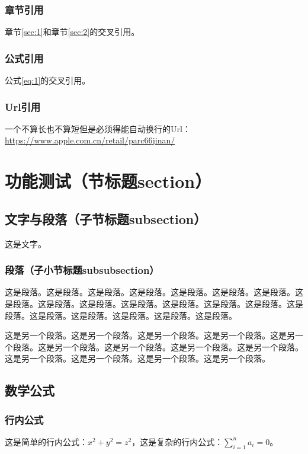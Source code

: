 \begin{ujnbody}
    \subsubsection{章节引用}
    章节\ref{sec:1}和章节\ref{sec:2}的交叉引用。
    \subsubsection{公式引用}
    公式\ref{eq:1}的交叉引用。
    \subsubsection{Url引用}
    一个不算长也不算短但是必须得能自动换行的Url：\url{https://www.apple.com.cn/retail/parc66jinan/}
    \section{功能测试（节标题section）}
    \subsection{文字与段落（子节标题subsection）}
    这是文字。
    \subsubsection{段落（子小节标题subsubsection）}
    这是段落。这是段落。这是段落。这是段落。这是段落。这是段落。这是段落。这是段落。这是段落。这是段落。这是段落。这是段落。这是段落。这是段落。这是段落。这是段落。这是段落。这是段落。这是段落。这是段落。

    这是另一个段落。这是另一个段落。这是另一个段落。这是另一个段落。这是另一个段落。这是另一个段落。这是另一个段落。这是另一个段落。这是另一个段落。这是另一个段落。这是另一个段落。这是另一个段落。这是另一个段落。
    \subsection{数学公式}
    \subsubsection{行内公式}
    这是简单的行内公式：$x^2+y^2=z^2$，这是复杂的行内公式：$\sum_{i=1}^n a_i=0$。

\end{ujnbody}
